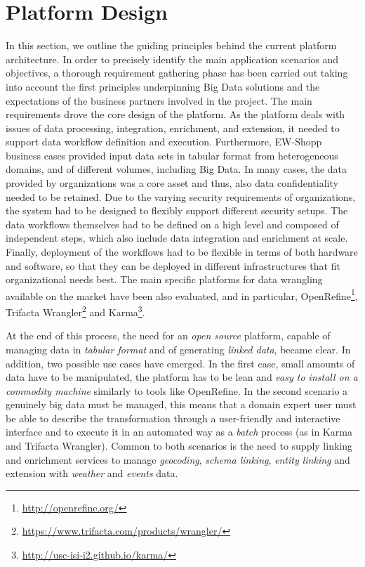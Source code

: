 \section{Platform Design}\label{sec:approach}

In this section, we outline the guiding principles behind the current platform architecture. 
In order to precisely identify the main application scenarios and objectives, a thorough requirement gathering phase has been carried out taking into account the first principles underpinning Big Data solutions and the expectations of the business partners involved in the project. The main requirements drove the core design of the platform. As the platform deals with issues of data processing, integration, enrichment, and extension, it needed to support data workflow definition and execution. 
Furthermore, EW-Shopp business cases provided input data sets in tabular format from heterogeneous domains, and of different volumes, including Big Data. In many cases, the data provided by organizations was a core asset and thus, also data confidentiality needed to be retained. 
Due to the varying security requirements of organizations, the system had to be designed to flexibly support different security setups. The data workflows themselves had to be defined on a high level and composed of independent steps, which also include data integration and enrichment at scale. Finally, deployment of the workflows had to be flexible in terms of both hardware and software, so that they can be deployed in different infrastructures that fit organizational needs best.
The main specific platforms for data wrangling available on the market have been also evaluated, and in particular, OpenRefine\footnote{\url{http://openrefine.org/}}, Trifacta Wrangler\footnote{\url{https://www.trifacta.com/products/wrangler/}} and Karma\footnote{\url{http://usc-isi-i2.github.io/karma/}}. 

At the end of this process, the need for an \textit{open source} platform, capable of managing data in \textit{tabular format} and of generating \textit{linked data}, became clear. 
In addition, two possible use cases have emerged. In the first case, small amounts of data have to be manipulated, the platform has to be lean and \textit{easy to install on a commodity machine} similarly to tools like OpenRefine. In the second scenario a genuinely big data must be managed, this means that a domain expert user must be able to describe the transformation through a user-friendly and interactive interface and to execute it in an automated way as a \textit{batch} process (as in Karma and Trifacta Wrangler). 
Common to both scenarios is the need to supply linking and enrichment services to manage \textit{geocoding}, \textit{schema linking}, \textit{entity linking} and extension with \textit{weather} and \textit{events} data. 

